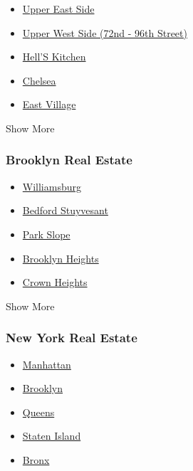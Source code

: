 \begin{itemize}
\tightlist
\item
  \href{/real-estate/usa/ny/new-york/upper-east-side/homes-for-rent}{Upper
  East Side}
\item
  \href{/real-estate/usa/ny/new-york/upper-west-side-(72nd-96th-street)/homes-for-rent}{Upper
  West Side (72nd - 96th Street)}
\item
  \href{/real-estate/usa/ny/new-york/hell-s-kitchen/homes-for-rent}{Hell'S
  Kitchen}
\item
  \href{/real-estate/usa/ny/new-york/chelsea/homes-for-rent}{Chelsea}
\item
  \href{/real-estate/usa/ny/new-york/east-village/homes-for-rent}{East
  Village}
\end{itemize}

Show More

\hypertarget{brooklyn-real-estate}{%
\subsubsection{Brooklyn Real Estate}\label{brooklyn-real-estate}}

\begin{itemize}
\tightlist
\item
  \href{/real-estate/usa/ny/brooklyn/williamsburg/homes-for-rent}{Williamsburg}
\item
  \href{/real-estate/usa/ny/brooklyn/bedford-stuyvesant/homes-for-rent}{Bedford
  Stuyvesant}
\item
  \href{/real-estate/usa/ny/brooklyn/park-slope/homes-for-rent}{Park
  Slope}
\item
  \href{/real-estate/usa/ny/brooklyn/brooklyn-heights/homes-for-rent}{Brooklyn
  Heights}
\item
  \href{/real-estate/usa/ny/brooklyn/crown-heights/homes-for-rent}{Crown
  Heights}
\end{itemize}

Show More

\hypertarget{new-york-real-estate}{%
\subsubsection{New York Real Estate}\label{new-york-real-estate}}

\begin{itemize}
\tightlist
\item
  \href{/real-estate/usa/ny/new-yorknew-york-ny-usa/homes-for-rent}{Manhattan}
\item
  \href{/real-estate/usa/ny/brooklynbrooklyn-ny-usa/homes-for-rent}{Brooklyn}
\item
  \href{/real-estate/usa/ny/queensqueens-ny-usa/homes-for-rent}{Queens}
\item
  \href{/real-estate/usa/ny/staten-islandstaten-island-ny-usa/homes-for-rent}{Staten
  Island}
\item
  \href{/real-estate/usa/ny/bronxbronx-ny-usa/homes-for-rent}{Bronx}
\end{itemize}

